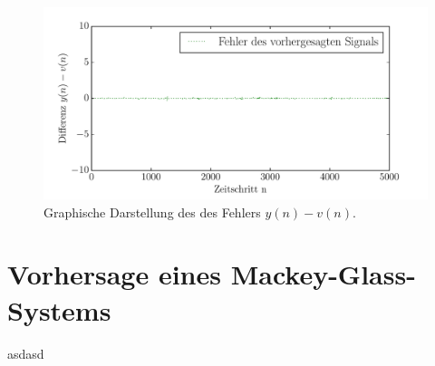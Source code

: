 \begin{figure}[H]
    \centering
    \includegraphics[width = 0.9 \textwidth]{figures/roessler_cross_err.pdf}
    \caption{Graphische Darstellung des des Fehlers $y(n)-v(n)$.}
    \label{fig:application_roessler_b2}
\end{figure}

\section{Vorhersage eines Mackey-Glass-Systems}
asdasd
